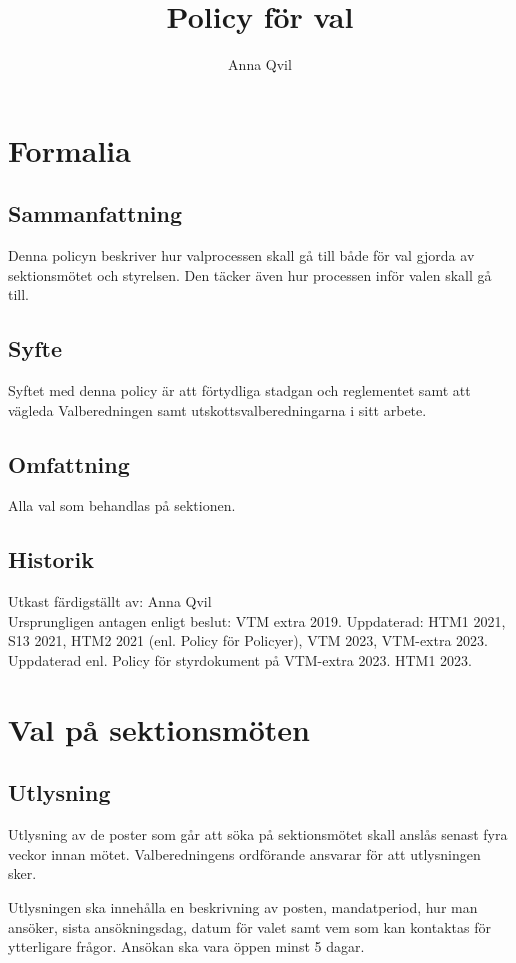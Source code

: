 \documentclass{dsekprotokoll}
\title{Policy för val}
\author{Anna Qvil}
\begin{document}
\maketitle
\section{Formalia}
\subsection{Sammanfattning}
Denna policyn beskriver hur valprocessen skall gå till både för val gjorda av sektionsmötet och styrelsen. Den täcker även hur processen inför valen skall gå till.

\subsection{Syfte}
Syftet med denna policy är att förtydliga stadgan och reglementet samt att vägleda Valberedningen samt utskottsvalberedningarna i sitt arbete.

\subsection{Omfattning}
Alla val som behandlas på sektionen.

\subsection{Historik}
Utkast färdigställt av: Anna Qvil \\
Ursprungligen antagen enligt beslut: VTM extra 2019.
Uppdaterad: HTM1 2021, S13 2021, HTM2 2021 (enl. Policy för Policyer), VTM 2023, VTM-extra 2023. Uppdaterad enl. Policy för styrdokument på VTM-extra 2023. HTM1 2023.


\section{Val på sektionsmöten}

\subsection{Utlysning}
Utlysning av de poster som går att söka på sektionsmötet skall anslås senast fyra veckor innan mötet. Valberedningens ordförande ansvarar för att utlysningen sker.

Utlysningen ska innehålla en beskrivning av posten, mandatperiod, hur man ansöker, sista  ansökningsdag, datum för valet samt vem som kan kontaktas för ytterligare frågor. Ansökan ska vara öppen minst 5 dagar.
\end{document}
